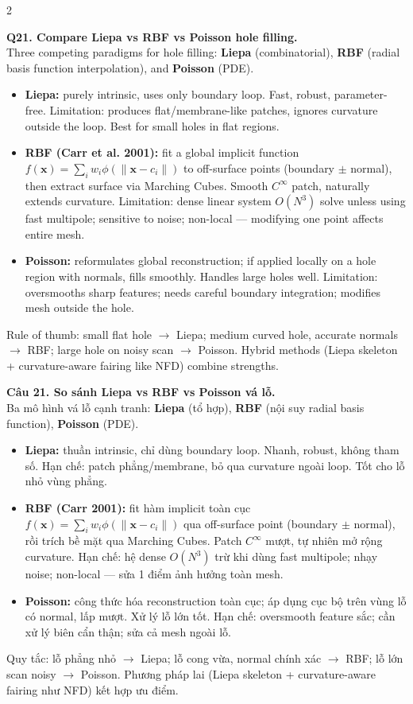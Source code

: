 \begin{paracol}{2}
\switchcolumn*

\textbf{Q21. Compare Liepa vs RBF vs Poisson hole filling.}\\
Three competing paradigms for hole filling: \textbf{Liepa} (combinatorial), \textbf{RBF} (radial basis function interpolation), and \textbf{Poisson} (PDE).
\begin{itemize}[leftmargin=*,nosep]
\item \textbf{Liepa:} purely intrinsic, uses only boundary loop. Fast, robust, parameter-free. Limitation: produces flat/membrane-like patches, ignores curvature outside the loop. Best for small holes in flat regions.
\item \textbf{RBF (Carr et al. 2001):} fit a global implicit function $f(\mathbf{x}) = \sum_i w_i \phi(\|\mathbf{x}-c_i\|)$ to off-surface points (boundary $\pm$ normal), then extract surface via Marching Cubes. Smooth $C^\infty$ patch, naturally extends curvature. Limitation: dense linear system $O(N^3)$ solve unless using fast multipole; sensitive to noise; non-local — modifying one point affects entire mesh.
\item \textbf{Poisson:} reformulates global reconstruction; if applied locally on a hole region with normals, fills smoothly. Handles large holes well. Limitation: oversmooths sharp features; needs careful boundary integration; modifies mesh outside the hole.
\end{itemize}
Rule of thumb: small flat hole $\to$ Liepa; medium curved hole, accurate normals $\to$ RBF; large hole on noisy scan $\to$ Poisson. Hybrid methods (Liepa skeleton + curvature-aware fairing like NFD) combine strengths.

\switchcolumn

\textbf{Câu 21. So sánh Liepa vs RBF vs Poisson vá lỗ.}\\
Ba mô hình vá lỗ cạnh tranh: \textbf{Liepa} (tổ hợp), \textbf{RBF} (nội suy radial basis function), \textbf{Poisson} (PDE).
\begin{itemize}[leftmargin=*,nosep]
\item \textbf{Liepa:} thuần intrinsic, chỉ dùng boundary loop. Nhanh, robust, không tham số. Hạn chế: patch phẳng/membrane, bỏ qua curvature ngoài loop. Tốt cho lỗ nhỏ vùng phẳng.
\item \textbf{RBF (Carr 2001):} fit hàm implicit toàn cục $f(\mathbf{x}) = \sum_i w_i \phi(\|\mathbf{x}-c_i\|)$ qua off-surface point (boundary $\pm$ normal), rồi trích bề mặt qua Marching Cubes. Patch $C^\infty$ mượt, tự nhiên mở rộng curvature. Hạn chế: hệ dense $O(N^3)$ trừ khi dùng fast multipole; nhạy noise; non-local — sửa 1 điểm ảnh hưởng toàn mesh.
\item \textbf{Poisson:} công thức hóa reconstruction toàn cục; áp dụng cục bộ trên vùng lỗ có normal, lấp mượt. Xử lý lỗ lớn tốt. Hạn chế: oversmooth feature sắc; cần xử lý biên cẩn thận; sửa cả mesh ngoài lỗ.
\end{itemize}
Quy tắc: lỗ phẳng nhỏ $\to$ Liepa; lỗ cong vừa, normal chính xác $\to$ RBF; lỗ lớn scan noisy $\to$ Poisson. Phương pháp lai (Liepa skeleton + curvature-aware fairing như NFD) kết hợp ưu điểm.


\end{paracol}
